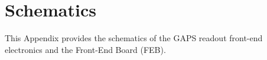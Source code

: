\chapter{Schematics} \label{appendixPCB}

This Appendix provides the schematics of the GAPS readout front-end electronics and the Front-End Board (FEB).




